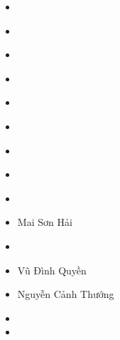 \documentclass[letterpaper,11pt,english]{sphinxmanual}
\begin{document}
\begin{itemize}
\item {} 
\end{itemize}


\begin{itemize}
\item {} 
\end{itemize}


\begin{itemize}
\item {} 
\end{itemize}


\begin{itemize}
\item {} 
\end{itemize}


\begin{itemize}
\item {} 
\end{itemize}


\begin{itemize}
\item {} 
\end{itemize}


\begin{itemize}
\item {} 
\end{itemize}


\begin{itemize}
\item {} 
\end{itemize}


\begin{itemize}
\item {} 
\end{itemize}


\begin{itemize}
\item {} 
Mai Sơn Hải

\item {} 
\end{itemize}


\begin{itemize}
\item {} 
Vũ Đình Quyền

\item {} 
Nguyễn Cảnh Thướng

\end{itemize}


\begin{itemize}
\item {} 


\item {} 
\end{itemize}
\end{document}
